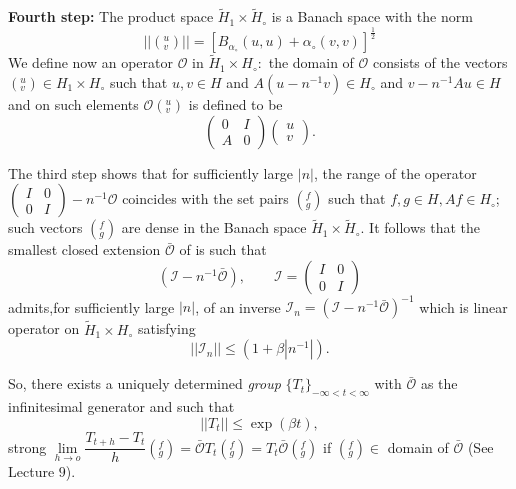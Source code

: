\medskip
 \noindent
 {\bf Fourth step:} The product space $\tilde{H}_1 \times
 \tilde{H}_\circ$ is a Banach space with the norm 
 $$
 || (^u_v) || = [B_{\alpha_\circ} (u, u) + \alpha_\circ (v, v)]^{\frac{1}{2}}
 $$
 We define now an operator $\mathscr{O}$ in $\tilde{H}_1 \times
 H_\circ:$ the domain of $\mathscr{O}$ consists of the vectors
 $(^u_v) \in H_1 \times H_\circ $ such that $u, v \in H$ and
 $A(u-n^{-1}v) \in H_\circ$ and $v - n^{-1} A u \in H$ and on such
 elements $\mathscr{O} (^u_v)$ is defined to be 
 $$
 \begin{pmatrix} 0 & I \\ A & 0 \end{pmatrix}\begin{pmatrix}
   u\\  v \end{pmatrix}. 
 $$
 

The third step shows that for sufficiently large $|n|$, the range of
the operator $\begin{pmatrix} I & 0 \\ 0 & I \end{pmatrix} - n^{-1}
\mathscr{O}$ coincides with the set pairs $(^f_g)$ such that $f, g \in
H, A f \in H_\circ$; such vectors $(^f_g)$ are dense in the Banach
space $\tilde {H}_1 \times \tilde{H}_\circ$. It follows that the
smallest closed extension $\bar{\mathscr{O}}$ of is such that 
$$
(\mathscr{I} - n^{-1}\bar{\mathscr{O}}), \qquad \mathscr{I}
= \begin{pmatrix} I & 0 \\ 0 & I \end{pmatrix} 
$$
admits,\pageoriginale for sufficiently large $| n |$, of an inverse $\mathscr{I}_n =
(\mathscr{I} -n^{-1} \bar{\mathscr{O}})^{-1}$ which is linear operator
on $\tilde{H}_1 \times H_\circ$ satisfying 
$$
|| \mathscr{I}_n || \leq (1 + \beta | n^{-1}| ).
$$

So, there exists a uniquely determined \textit{group} $\{T_t\}_{-
 \infty < t< \infty}$ with $\bar{\mathscr{O}}$ as the infinitesimal
generator and such that 
$$
|| T_t || \leq \exp (\beta t),
$$
strong $\lim \limits_{h \to o} \dfrac{T_{t+h}-T_t}{h}(^f_g) =
\bar{\mathscr{O}}T_t (^f_g) = T_t \bar{\mathscr{O}}(^f_g)$ if $(^f_g)
\in $ domain of $\bar{\mathscr{O}}$ (See Lecture $9$). 
